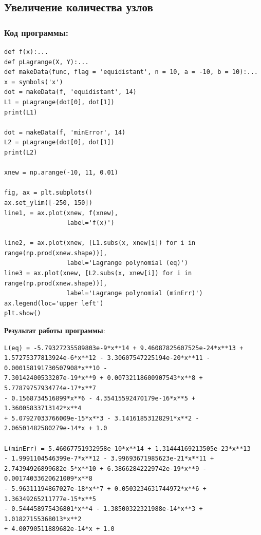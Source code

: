 \documentclass[12pt,a4paper]{article}
\begin{document}
\vspace{190cm}
\subsection{Увеличение количества узлов}

\subsubsection{Код программы:}
\begin{verbatim}
def f(x):...
def pLagrange(X, Y):...
def makeData(func, flag = 'equidistant', n = 10, a = -10, b = 10):...
x = symbols('x')
dot = makeData(f, 'equidistant', 14)
L1 = pLagrange(dot[0], dot[1])
print(L1)

dot = makeData(f, 'minError', 14)
L2 = pLagrange(dot[0], dot[1])
print(L2)

xnew = np.arange(-10, 11, 0.01)

fig, ax = plt.subplots()
ax.set_ylim([-250, 150])
line1, = ax.plot(xnew, f(xnew),
                 label='f(x)')

line2, = ax.plot(xnew, [L1.subs(x, xnew[i]) for i in range(np.prod(xnew.shape))],
                 label='Lagrange polynomial (eq)')
line3 = ax.plot(xnew, [L2.subs(x, xnew[i]) for i in range(np.prod(xnew.shape))],
                 label='Lagrange polynomial (minErr)')
ax.legend(loc='upper left')
plt.show()

\end{verbatim}
\textbf{Результат работы программы}:\\
\begin{verbatim}
L(eq) = -5.79327235589803e-9*x**14 + 9.46087825607525e-24*x**13 +
1.57275377813924e-6*x**12 - 3.30607547225194e-20*x**11 - 0.000158191730507908*x**10 - 
7.30142400533207e-19*x**9 + 0.00732118600907543*x**8 + 5.77879757934774e-17*x**7 
- 0.1568734516899*x**6 - 4.35415592470179e-16*x**5 + 1.36005833713142*x**4 
+ 5.07927033766009e-15*x**3 - 3.14161853128291*x**2 - 2.06501482580279e-14*x + 1.0 

L(minErr) = 5.46067751932958e-10*x**14 + 1.31444169213505e-23*x**13
- 1.9991104546399e-7*x**12 - 3.99693671985623e-21*x**11 +
2.74394926899682e-5*x**10 + 6.38662842229742e-19*x**9 - 0.00174033620621009*x**8
- 5.96311194867027e-18*x**7 + 0.0503234631744972*x**6 + 1.36349265211777e-15*x**5 
- 0.544458975436801*x**4 - 1.38500322321988e-14*x**3 + 1.01827155368013*x**2
+ 4.00790511889682e-14*x + 1.0
\end{verbatim}
\end{document}
